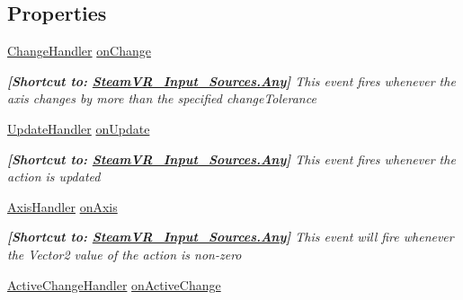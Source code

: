 \subsection*{Properties}
\begin{DoxyCompactItemize}
\item 
\mbox{\hyperlink{class_valve_1_1_v_r_1_1_steam_v_r___action___vector2_ad390de62736aedd5be93238b1840ffec}{Change\+Handler}} \mbox{\hyperlink{class_valve_1_1_v_r_1_1_steam_v_r___action___vector2_a339f6effe1596dd43a10ee68869f66e6}{on\+Change}}
\begin{DoxyCompactList}\small\item\em {\bfseries{\mbox{[}Shortcut to\+: \mbox{\hyperlink{namespace_valve_1_1_v_r_a82e5bf501cc3aa155444ee3f0662853faed36a1ef76a59ee3f15180e0441188ad}{Steam\+V\+R\+\_\+\+Input\+\_\+\+Sources.\+Any}}\mbox{]}}} This event fires whenever the axis changes by more than the specified change\+Tolerance \end{DoxyCompactList}\item 
\mbox{\hyperlink{class_valve_1_1_v_r_1_1_steam_v_r___action___vector2_a3f6872fd8960cbb9f571b0362857d9b5}{Update\+Handler}} \mbox{\hyperlink{class_valve_1_1_v_r_1_1_steam_v_r___action___vector2_a26a550d86f7daabe09bc123e2ce7bd77}{on\+Update}}
\begin{DoxyCompactList}\small\item\em {\bfseries{\mbox{[}Shortcut to\+: \mbox{\hyperlink{namespace_valve_1_1_v_r_a82e5bf501cc3aa155444ee3f0662853faed36a1ef76a59ee3f15180e0441188ad}{Steam\+V\+R\+\_\+\+Input\+\_\+\+Sources.\+Any}}\mbox{]}}} This event fires whenever the action is updated \end{DoxyCompactList}\item 
\mbox{\hyperlink{class_valve_1_1_v_r_1_1_steam_v_r___action___vector2_a11d8b99df804d185a33c7c60791ef426}{Axis\+Handler}} \mbox{\hyperlink{class_valve_1_1_v_r_1_1_steam_v_r___action___vector2_a8572a98f22c7a84fdbeabb69b34580b2}{on\+Axis}}
\begin{DoxyCompactList}\small\item\em {\bfseries{\mbox{[}Shortcut to\+: \mbox{\hyperlink{namespace_valve_1_1_v_r_a82e5bf501cc3aa155444ee3f0662853faed36a1ef76a59ee3f15180e0441188ad}{Steam\+V\+R\+\_\+\+Input\+\_\+\+Sources.\+Any}}\mbox{]}}} This event will fire whenever the Vector2 value of the action is non-\/zero \end{DoxyCompactList}\item 
\mbox{\hyperlink{class_valve_1_1_v_r_1_1_steam_v_r___action___vector2_ad01c83284de71c0d9cd8f7e673ce5ab5}{Active\+Change\+Handler}} \mbox{\hyperlink{class_valve_1_1_v_r_1_1_steam_v_r___action___vector2_afaa6f3e9d0ef1e3ef5555401598de607}{on\+Active\+Change}}

\end{DoxyCompactItemize}
